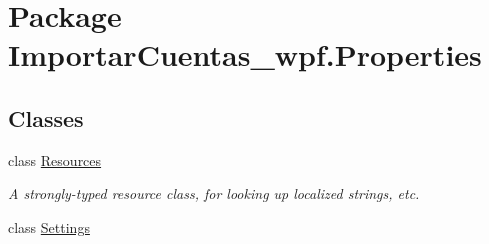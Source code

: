 \hypertarget{namespace_importar_cuentas__wpf_1_1_properties}{\section{Package Importar\-Cuentas\-\_\-wpf.\-Properties}
\label{namespace_importar_cuentas__wpf_1_1_properties}
}
\subsection*{Classes}
\begin{DoxyCompactItemize}
\item 
class \hyperlink{class_importar_cuentas__wpf_1_1_properties_1_1_resources}{Resources}
\begin{DoxyCompactList}\small\item\em A strongly-\/typed resource class, for looking up localized strings, etc. \end{DoxyCompactList}\item 
class \hyperlink{class_importar_cuentas__wpf_1_1_properties_1_1_settings}{Settings}
\end{DoxyCompactItemize}
